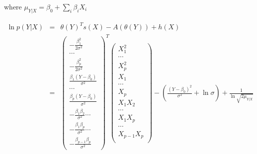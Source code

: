 \documentclass[11pt, oneside]{article}   	%
\numberwithin{figure}{section}
\numberwithin{equation}{section}
\numberwithin{table}{section}
\begin{document}
where $\mu_{Y|X} = \beta_0+\sum_i{\beta_i X_i}$

\begin{eqnarray*}
\ln p(Y|X) &=& \theta(Y)^T s(X) - A(\theta(Y)) + h(X)\\
&=&
\begin{pmatrix}
-\frac{\beta_1^2}{2\sigma^2}\\
\cdots\\
-\frac{\beta_p^2}{2\sigma^2}\\
\frac{\beta_1(Y-\beta_0)}{\sigma^2}\\
\cdots\\
\frac{\beta_p(Y-\beta_0)}{\sigma^2}\\
-\frac{\beta_1\beta_2}{\sigma^2}
\cdots\\
-\frac{\beta_1\beta_p}{\sigma^2}
\cdots\\
-\frac{\beta_{p-1}\beta_p}{\sigma^2}
\end{pmatrix}^T
\begin{pmatrix}
X_1^2\\
\cdots\\
X_p^2\\
X_1\\
\cdots\\
X_p\\
X_1 X_2\\
\cdots\\
X_1 X_p\\
\cdots\\
X_{p-1}X_{p}\\
\end{pmatrix}
- \left( \frac{(Y-\beta_0)^2}{\sigma^2} + \ln{\sigma} \right) + \frac{1}{\ln{\sqrt{2\mu_{Y|X}}}}
\end{eqnarray*}
\end{document}
